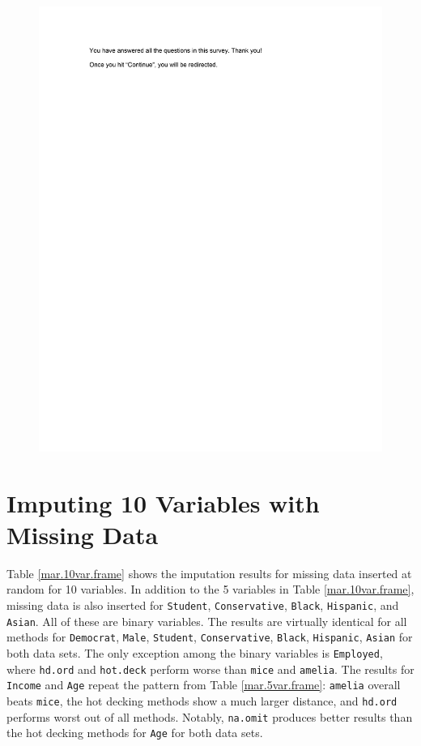 \documentclass[12pt,econ]{sources/authesis}
\makeatletter
\def\maxwidth{\ifdim\Gin@nat@width>\linewidth\linewidth
\else\Gin@nat@width\fi}
\let\Oldincludegraphics\includegraphics
\renewcommand{\includegraphics}[1]{\Oldincludegraphics[width=\maxwidth]{#1}}
\makeatother
\begin{document}
\begin{figure}[hbt]
  \centering
\includegraphics{data/framing/appendix/questionnaire/questionnaire22.jpg}
\end{figure}
\clearpage

\hypertarget{app-framing-10var}{%
\section{Imputing 10 Variables with Missing Data}\label{app-framing-10var}}

Table \ref{mar.10var.frame} shows the imputation results for missing data inserted at random for 10 variables. In addition to the 5 variables in Table \ref{mar.10var.frame}, missing data is also inserted for \texttt{Student}, \texttt{Conservative}, \texttt{Black}, \texttt{Hispanic}, and \texttt{Asian}. All of these are binary variables. The results are virtually identical for all methods for \texttt{Democrat}, \texttt{Male}, \texttt{Student}, \texttt{Conservative}, \texttt{Black}, \texttt{Hispanic}, \texttt{Asian} for both data sets. The only exception among the binary variables is \texttt{Employed}, where \texttt{hd.ord} and \texttt{hot.deck} perform worse than \texttt{mice} and \texttt{amelia}. The results for \texttt{Income} and \texttt{Age} repeat the pattern from Table \ref{mar.5var.frame}: \texttt{amelia} overall beats \texttt{mice}, the hot decking methods show a much larger distance, and \texttt{hd.ord} performs worst out of all methods. Notably, \texttt{na.omit} produces better results than the hot decking methods for \texttt{Age} for both data sets.
\end{document}

